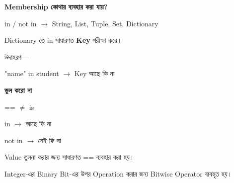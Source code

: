 \begin{rememberbox}

\textbf{\color{deepOrange}Membership কোথায় ব্যবহার করা যায়?}

\begin{center}

\textenglish{\ttfamily in / not in}
\(\longrightarrow\)
String, List, Tuple, Set, Dictionary

\end{center}

Dictionary-তে
\textenglish{\ttfamily in}
সাধারণত \textbf{Key} পরীক্ষা করে।

উদাহরণ—

\begin{center}

\textenglish{\ttfamily "name" in student}
\(\longrightarrow\)
Key আছে কি না

\end{center}

\end{rememberbox}

\begin{rememberbox}

\textbf{\color{deepOrange}ভুল করো না}

\begin{center}

\textenglish{\ttfamily ==}
\(\neq\)
\textenglish{\ttfamily is}

\qquad

\textenglish{\ttfamily in}
\(\longrightarrow\)
আছে কি না

\qquad

\textenglish{\ttfamily not in}
\(\longrightarrow\)
নেই কি না

\end{center}

Value তুলনা করার জন্য সাধারণত
\textenglish{\ttfamily ==}
ব্যবহার করা হয়।

\end{rememberbox}



Integer-এর Binary Bit-এর উপর Operation করার জন্য
Bitwise Operator ব্যবহৃত হয়।

